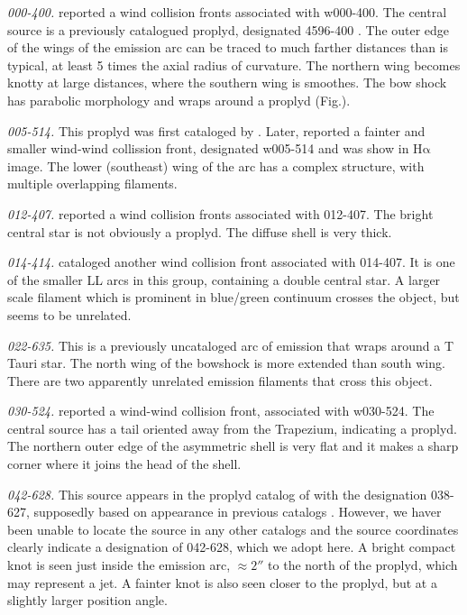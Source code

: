 \documentclass[apj, twocolumn]{aastex63}
\newcommand\ha{\ensuremath{\mathrm{H\alpha}}}
\begin{document}
\textit{000-400.} \citet{Bally:2000a} reported a wind collision fronts
associated with w000-400. The central source is a previously catalogued
proplyd, designated 4596-400 \citep{Ricci:2008a}. The outer edge of
the wings of the emission arc can be traced to much farther distances
than is typical, at least 5 times the axial radius of curvature.
The northern wing becomes knotty at large distances, where  the southern
wing is smoothes. The bow shock has parabolic morphology and wraps around
a proplyd (Fig.).   

\textit{005-514.} This proplyd was first cataloged by \citet{ODell:1996a}.
Later, \citet{Bally:2000a} reported a fainter and smaller wind-wind
collission front, designated w005-514 and was show in \ha{} image.
The lower (southeast) wing of the arc has a complex structure, with
multiple overlapping filaments.

\textit{012-407.} \citet{Bally:2000a} reported a wind collision fronts
associated with 012-407. The bright central star is not obviously a
proplyd. The diffuse shell is very thick.  

\textit{014-414.} \citet{Bally:2000a} cataloged another wind collision
front associated with 014-407. It is one of the smaller LL arcs in this
group, containing a double central star. A larger scale filament which
is prominent in blue/green continuum crosses the object, but seems to be
unrelated. 

\textit{022-635.} This is a previously uncataloged arc of emission that
wraps around a T Tauri star. The north wing of the bowshock is more
extended than south wing. There are two apparently unrelated emission
filaments that cross this object. 

\textit{030-524.} \citet{Bally:2000a} reported a wind-wind collision front,
associated with w030-524. The central source has a tail oriented away from
the Trapezium, indicating a proplyd. The northern outer edge of the
asymmetric shell is very flat and it makes a sharp corner where it joins
the head of the shell.


\textit{042-628.} This source appears in the proplyd catalog of
\citet{Ricci:2008a} with the designation 038-627, supposedly based on
appearance in previous catalogs \citep{ODell:1996a}. However, we haver
been unable to locate the source in any other catalogs and the source
coordinates clearly indicate a designation of 042-628, which we adopt
here.  A bright compact knot is seen just inside the emission arc,
\(\approx 2''\) to the north of the proplyd, which may represent a
jet.  A fainter knot is also seen closer to the proplyd, but at a
slightly larger position angle.
\end{document}
